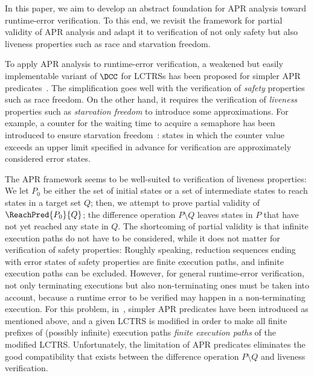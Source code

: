 In this paper, we aim to develop an abstract foundation for APR analysis toward runtime-error verification.
To this end, we revisit the framework for partial validity of APR analysis and adapt it to verification of not only safety but also liveness properties such as race and starvation freedom.

To apply APR analysis to runtime-error verification, a weakened but easily implementable variant of $\DCC$ for LCTRSs has been proposed for simpler APR predicates~\cite{KN23jlamp}.
The simplification goes well with the verification of \emph{safety} properties such as race freedom.
On the other hand, it requires the verification of \emph{liveness} properties such as \emph{starvation freedom} to introduce some approximations.
For example, a counter for the waiting time to acquire a semaphore has been introduced to ensure starvation freedom~\cite{KN23padl}:
states in which the counter value exceeds an upper limit specified in advance for verification are approximately considered error states.

The APR framework seems to be well-suited to verification of liveness properties:
We let $P_0$ be either the set of initial states or a set of intermediate states to reach states in a target set $Q$;
then, we attempt to prove partial validity of $\ReachPred{P_0}{Q}$;
the difference operation $P \setminus Q$ leaves states in $P$ that have not yet reached any state in $Q$.
The shortcoming of partial validity is that infinite execution paths do not have to be considered, while it does not matter for verification of safety properties:
Roughly speaking, reduction sequences ending with error states of safety properties are finite execution paths, and infinite execution paths can be excluded.
However, for general runtime-error verification, not only terminating executions but also non-terminating ones must be taken into account, because a runtime error to be verified may happen in a non-terminating execution.
For this problem, in~\cite{KN23jlamp}, simpler APR predicates have been introduced as mentioned above, and a given LCTRS is modified in order to make all finite prefixes of (possibly infinite) execution paths \emph{finite execution paths} of the modified LCTRS.
Unfortunately, the limitation of APR predicates eliminates the good compatibility that exists between the difference operation $P \setminus Q$ and liveness verification.

